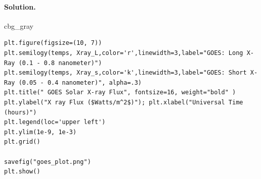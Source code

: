 \documentclass[%
oneside,                 %
final,                   %
10pt,french]{article}
\newenvironment{_cod_tight}[1]{
   \def\FrameCommand{\colorbox{#1}}
   \FrameRule0.6pt\MakeFramed {\FrameRestore}\vskip3mm}
   {\vskip0mm\endMakeFramed}
\newenvironment{cod}[1]{
\bgroup\rmfamily
\fboxsep=0mm\relax
\begin{_cod_tight}{#1}
\list{}{\parsep=-2mm\parskip=0mm\topsep=0pt\leftmargin=2mm
\rightmargin=2\leftmargin\leftmargin=4pt\relax}
\item\relax}
{\endlist\end{_cod_tight}\egroup}
\newenvironment{doconceexercise}{}{}
\begin{document}
\begin{doconceexercise}
\vspace{6mm}




\paragraph{Solution.}
\begin{cod}{cbg_gray}\begin{verbatim}
plt.figure(figsize=(10, 7))
plt.semilogy(temps, Xray_L,color='r',linewidth=3,label="GOES: Long X-Ray (0.1 - 0.8 nanometer)")
plt.semilogy(temps, Xray_s,color='k',linewidth=3,label="GOES: Short X-Ray (0.05 - 0.4 nanometer)", alpha=.3)
plt.title(" GOES Solar X-ray Flux", fontsize=16, weight="bold" )
plt.ylabel("X ray Flux ($Watts/m^2$)"); plt.xlabel("Universal Time (hours)")
plt.legend(loc='upper left')
plt.ylim(1e-9, 1e-3)
plt.grid()

savefig("goes_plot.png")
plt.show()
\end{verbatim}
\end{cod}
\noindent


\end{doconceexercise}
\end{document}
